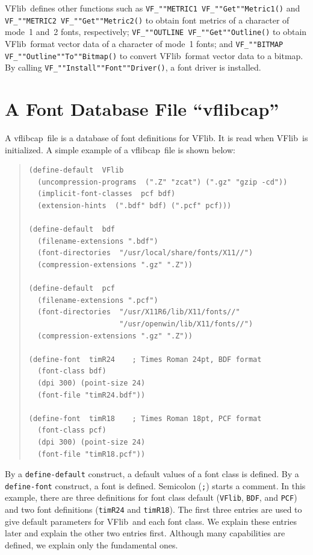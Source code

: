 \documentclass{cah-gut}
\newcommand{\pkg}[1]{\textsf{#1}}
\newcommand{\prog}[1]{\texttt{#1}}
\newcommand{\VFlib}{\pkg{VFlib}}
\newcommand{\vflibcap}{\pkg{vflibcap}}
\begin{document}
\VFlib\ defines other functions such as \prog{VF\_""METRIC1
  VF\_""Get""Metric1()} and \prog{VF\_""METRIC2 VF\_""Get""Metric2()}
to obtain font metrics of a character of mode~1 and~2 fonts,
respectively; \prog{VF\_""OUTLINE VF\_""Get""Outline()} to obtain
\VFlib\ format vector data of a character of mode~1 fonts; and
\prog{VF\_""BITMAP VF\_""Outline""To""Bitmap()} to convert \VFlib\ format
vector data to a bitmap.  By calling
\prog{VF\_""Install""Font""Driver()}, a font driver is installed.



\section{A Font Database File ``\vflibcap''}
\label{SEC:Vflibcap}

A \vflibcap\ file is a database of font definitions for \VFlib.  It is
read when \VFlib\ is initialized.  A simple example of a \vflibcap\ file
is shown below:

\begin{quote}
\begin{small}
\setlength{\baselineskip}{1em}
\begin{verbatim}
(define-default  VFlib
  (uncompression-programs  (".Z" "zcat") (".gz" "gzip -cd"))
  (implicit-font-classes  pcf bdf)
  (extension-hints  (".bdf" bdf) (".pcf" pcf)))

(define-default  bdf
  (filename-extensions ".bdf")
  (font-directories  "/usr/local/share/fonts/X11//")
  (compression-extensions ".gz" ".Z"))

(define-default  pcf
  (filename-extensions ".pcf")
  (font-directories  "/usr/X11R6/lib/X11/fonts//"
                     "/usr/openwin/lib/X11/fonts//")
  (compression-extensions ".gz" ".Z"))

(define-font  timR24    ; Times Roman 24pt, BDF format
  (font-class bdf)
  (dpi 300) (point-size 24)
  (font-file "timR24.bdf"))

(define-font  timR18    ; Times Roman 18pt, PCF format
  (font-class pcf)
  (dpi 300) (point-size 24)
  (font-file "timR18.pcf"))
\end{verbatim}
\end{small}
\end{quote}

By a \prog{define-default} construct, a default values of a font class
is defined.  By a \prog{define-font} construct, a font is defined.  
Semicolon (\prog{;}) starts a comment.
In this example, there are three definitions for font class default
(\prog{VFlib}, \prog{BDF}, and \prog{PCF}) and two font definitions
(\prog{timR24} and \prog{timR18}). The first three entries are used to
give default parameters for \VFlib\ and each font class.  We explain
these entries later and explain the other two entries first.  Although
many capabilities are defined, we explain only the fundamental ones.
\end{document}

